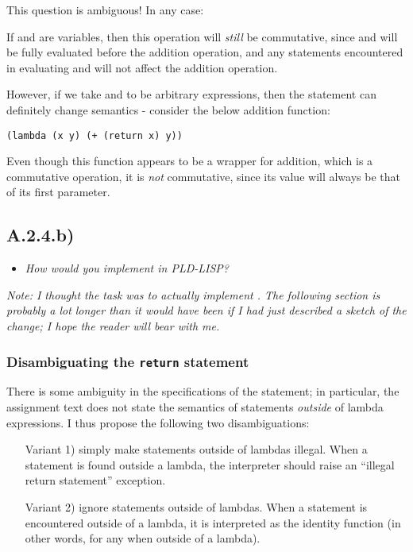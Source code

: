 This question is ambiguous! In any case:

\smallskip

If  and  are variables, then this operation will \emph{still} be
commutative, since  and  will be fully evaluated before the addition
operation, and any  statements encountered in evaluating  and
 will not affect the addition operation.

\medskip

However, if we take  and  to be arbitrary expressions, then the
 statement can definitely change semantics - consider the below
addition function:

\begin{verbatim}
(lambda (x y) (+ (return x) y))
\end{verbatim}

Even though this function appears to be a wrapper for addition, which is a
commutative operation, it is \emph{not} commutative, since its value will always
be that of its first parameter.

\sectend

\newpage
\subsection{A.2.4.b)}

\begin{itemize}
\item \emph{How would you implement  in PLD-LISP?}
\end{itemize}

\emph{Note: I thought the task was to actually implement . The
following section is probably a lot longer than it would have been if I had just
described a sketch of the change; I hope the reader will bear with me.}

\subsubsection{Disambiguating the \texttt{return} statement}

There is some ambiguity in the specifications of the  statement; in
particular, the assignment text does not state the semantics of 
statements \emph{outside} of lambda expressions. I thus propose the following
two disambiguations:

\begin{itemize}
  \item[Variant 1)] simply make  statements outside of lambdas
    illegal. When a  statement is found outside a lambda, the
    interpreter should raise an ``illegal return statement'' exception.

  \item[Variant 2)] ignore  statements outside of lambdas. When a
     statement is encountered outside of a lambda, it is interpreted
    as the identity function (in other words,  for any 
    when outside of a lambda).
\end{itemize}


